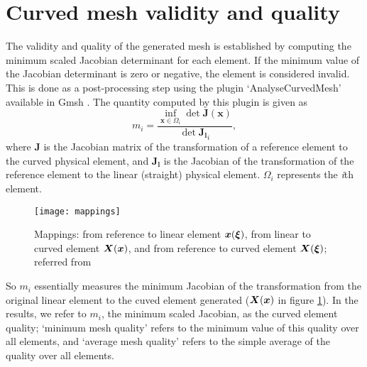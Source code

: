 \section{Curved mesh validity and quality}
\label{sec:curvedquality}
 The validity and quality of the generated mesh is established by computing the minimum scaled Jacobian determinant for each element. If the minimum value of the Jacobian determinant is zero or negative, the element is considered invalid. This is done as a post-processing step using the plugin `AnalyseCurvedMesh' available in Gmsh \cite{gmsh}. The quantity computed by this plugin is given as
 \begin{equation} 
 m_i = \frac{\inf_{\mathbf{x}\in\Omega_i}\det \mathbf{J}(\mathbf{x})}{\det \mathbf{J_l}_i},
 \end{equation}
 where $\mathbf{J}$ is the Jacobian matrix of the transformation of a reference element to the curved physical element, and $\mathbf{J_l}$ is the Jacobian of the transformation of the reference element to the linear (straight) physical element. $\Omega_i$ represents the \emph{i}th element.
 
 \begin{figure}[h!]
 	\centering
 	\texttt{[image: mappings]}
 	\caption{Mappings: from reference to linear element $\boldsymbol{x}(\boldsymbol{\xi})$, from linear to curved element $\boldsymbol{X}(\boldsymbol{x})$, and from reference to curved element $\boldsymbol{X}(\boldsymbol{\xi})$; referred from \cite{curve:validity}}
 	\label{fig:mappings}
 \end{figure}
 
 So $m_i$ essentially measures the minimum Jacobian of the transformation from the original linear element to the cuved element generated ($\boldsymbol{X}(\boldsymbol{x})$ in figure \ref{fig:mappings}). In the results, we refer to $m_i$, the minimum scaled Jacobian, as the curved element quality; `minimum mesh quality' refers to the minimum value of this quality over all elements, and `average mesh quality' refers to the simple average of the quality over all elements.